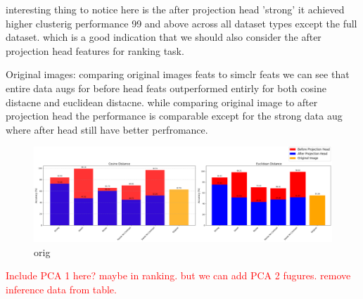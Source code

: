  interesting thing to notice here is the after projection head  'strong' it achieved higher clusterig performance 99 and above across all dataset types except 
 the full dataset. which is a good indication that we should also consider the after projection head features for ranking task.

    \begin{table}[H]
        \centering
        \caption{Evaluation Results Using Different Distance Metrics for original images}
        \label{tab:distance_metrics}
    \end{table}
    
Original images:
comparing original images feats to simclr feats we can see that entire data augs for  before head feats outperformed entirly for both cosine distacne and euclidean distacne.
while comparing original image to after projection head the performance is comparable except for the strong data aug where after head still have better perfromance.

\begin{figure}[H]
    \centering
    \includegraphics[scale=0.37]{figures/cluster.png} 
    \caption{orig}
    \label{fig:cluster}
\end{figure}



\textcolor{red}{Include PCA 1 here? maybe in ranking. but we can add PCA 2 fugures.}
\textcolor{red}{remove inference data from table.}

